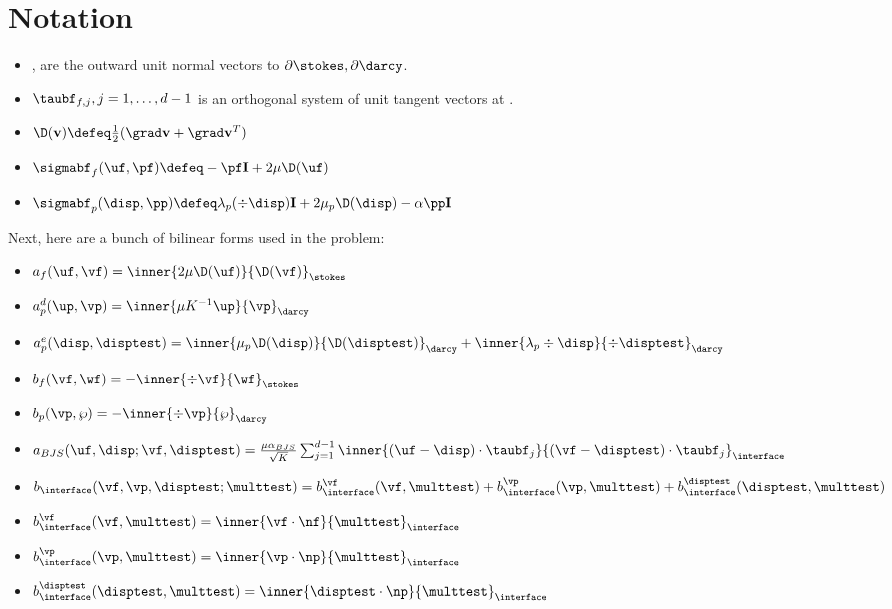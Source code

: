 \documentclass{article}
\begin{document}
\section{Notation}
\begin{itemize}
\item \nf, \np are the outward unit normal vectors to $\partial \stokes, \partial \darcy$. 
\item $\taubf_{f, j}, j = 1, \ldots, d-1$ is an orthogonal system of unit tangent vectors at \interface.
\item $\D(\mathbf{v}) \defeq \frac 12 (\grad \mathbf{v} + \grad \mathbf{v}^T)$
\item $\sigmabf_f(\uf, \pf) \defeq -\pf \mathbf{I} + 2 \mu \D(\uf)$
\item $\sigmabf_p(\disp, \pp) \defeq \lambda_p (\div \disp)\mathbf{I}  + 2 \mu_p \D(\disp) - \alpha \pp \mathbf{I} $
\end{itemize}

Next, here are a bunch of bilinear forms used in the problem: 
\begin{itemize}
\item $a_f(\uf, \vf) = \inner{2\mu \D(\uf)} {\D(\vf)}_{\stokes}$
\item $a_p^d(\up, \vp) = \inner{\mu K^{-1}\up} {\vp}_{\darcy}$
\item $a_p^e(\disp, \disptest) = \inner{\mu_p \D(\disp)} {\D(\disptest)}_{\darcy} + \inner{\lambda_p \div \disp} {\div \disptest}_{\darcy}$
\item $b_f(\vf, \wf) = -\inner{\div \vf}{\wf}_{\stokes}$
\item $b_p(\vp, \wp) = -\inner{\div \vp}{\wp}_{\darcy}$
  
\item $a_{BJS}(\uf, \disp; \vf, \disptest) = \frac {\mu \alpha_{BJS}} {\sqrt{K}} \sum_{j=1}^{d-1} \inner{(\uf - \disp) \cdot \taubf_j}{ (\vf - \disptest) \cdot \taubf_j}_{\interface} $
\item $b_{\interface}(\vf, \vp, \disptest; \multtest) = b_{\interface}^{\vf}(\vf, \multtest)  + b_{\interface}^{\vp}(\vp, \multtest) + b_{\interface}^{\disptest}(\disptest, \multtest)$

\item $b_{\interface}^{\vf}(\vf, \multtest) = \inner{\vf \cdot \nf}{\multtest}_{\interface}$
\item $b_{\interface}^{\vp}(\vp, \multtest) = \inner{\vp \cdot \np}{\multtest}_{\interface}$
\item $b_{\interface}^{\disptest}(\disptest, \multtest) = \inner{\disptest \cdot \np}{\multtest}_{\interface}$
  
\end{itemize}
\end{document}
